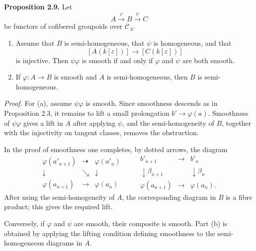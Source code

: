 \documentclass[11pt]{article}
\begin{document}
\textbf{Proposition 2.9.} Let
\[
 A\xrightarrow{\varphi}B\xrightarrow{\psi}C
\]
be functors of cofibered groupoids over \(\mathcal C_\Lambda\).
\begin{enumerate}[label=(\alph*)]
\item Assume that \(B\) is semi-homogeneous, that \(\psi\) is homogeneous, and that
\[
 [A(k[\varepsilon])]\longrightarrow [C(k[\varepsilon])]
\]
is injective. Then \(\psi\varphi\) is smooth if and only if \(\varphi\) and \(\psi\) are both
smooth.
\item If \(\varphi:A\to B\) is smooth and \(A\) is semi-homogeneous, then \(B\) is
semi-homogeneous.
\end{enumerate}

\emph{Proof.} For (a), assume \(\psi\varphi\) is smooth. Since smoothness descends as in
Proposition 2.3, it remains to lift a small prolongation \(b'\to\varphi(a)\). Smoothness of
\(\psi\varphi\) gives a lift in \(A\) after applying \(\psi\), and the semi-homogeneity of \(B\),
together with the injectivity on tangent classes, removes the obstruction.

In the proof of smoothness one completes, by dotted arrows, the diagram
\[
\begin{array}{ccccc}
\varphi(a'_{n+1}) & \dashrightarrow & \varphi(a'_n)\\
\downarrow & \searrow & \downarrow\\
\varphi(a_{n+1}) & \longrightarrow & \varphi(a_n)
\end{array}
\qquad
\begin{array}{ccc}
b'_{n+1} & \longrightarrow & b'_n\\
\downarrow{\scriptstyle \beta_{n+1}} && \downarrow{\scriptstyle \beta_n}\\
\varphi(a_{n+1}) & \longrightarrow & \varphi(a_n).
\end{array}
\]
After using the semi-homogeneity of \(A\), the corresponding diagram in \(B\) is a fibre
product; this gives the required lift.

Conversely, if
\(\varphi\) and \(\psi\) are smooth, their composite is smooth. Part (b) is obtained by applying
the lifting condition defining smoothness to the semi-homogeneous diagrams in \(A\).
\end{document}
